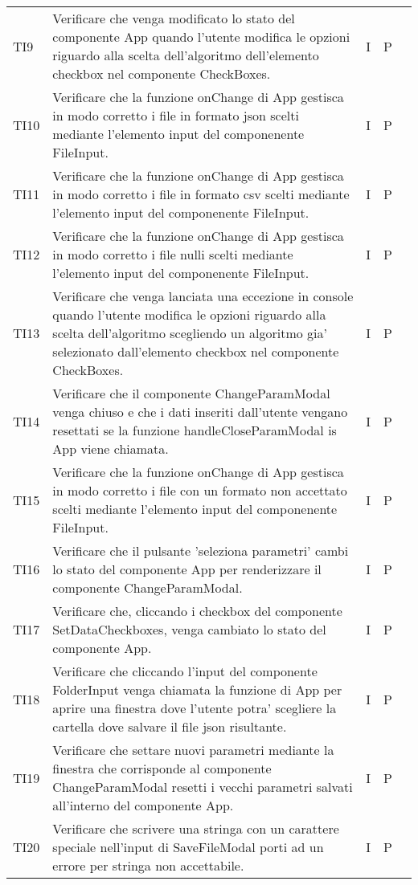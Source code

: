 \begin{longtable} {
		>{}p{15mm} 
		>{}p{79.5mm}
		>{}p{15mm} 
		>{}p{15mm}
		>{}p{0mm}}
    TI9      &  Verificare che venga modificato lo stato del componente App quando l'utente modifica le opzioni riguardo alla scelta dell'algoritmo dell'elemento checkbox nel componente CheckBoxes.& I & P  &\TBstrut \\ [2mm]
    TI10     &  Verificare che la funzione onChange di App gestisca in modo corretto i file in formato json scelti mediante l'elemento input del componenente FileInput.& I & P  &\TBstrut \\ [2mm]
    TI11     &  Verificare che la funzione onChange di App gestisca in modo corretto i file in formato csv scelti mediante l'elemento input del componenente FileInput.& I & P  &\TBstrut \\ [2mm]
    TI12     &  Verificare che la funzione onChange di App gestisca in modo corretto i file nulli scelti mediante l'elemento input del componenente FileInput.& I & P  &\TBstrut \\ [2mm]
    TI13     &  Verificare che venga lanciata una eccezione in console quando l'utente modifica le opzioni riguardo alla scelta dell'algoritmo scegliendo un algoritmo gia' selezionato dall'elemento checkbox nel componente CheckBoxes.& I & P  &\TBstrut \\ [2mm]
    TI14     &  Verificare che il componente ChangeParamModal venga chiuso e che i dati inseriti dall'utente vengano resettati  se la funzione handleCloseParamModal is App viene chiamata.& I & P  &\TBstrut \\ [2mm]
    TI15     &  Verificare che la funzione onChange di App gestisca in modo corretto i file con un formato non accettato scelti mediante l'elemento input del componenente FileInput.& I & P  &\TBstrut \\ [2mm]
    TI16     &  Verificare che il pulsante 'seleziona parametri' cambi lo stato del componente App per renderizzare il componente ChangeParamModal.& I & P  &\TBstrut \\ [2mm]
    TI17     &  Verificare che, cliccando i checkbox del componente SetDataCheckboxes, venga cambiato lo stato del componente App.& I & P  &\TBstrut \\ [2mm]
    TI18     &  Verificare che cliccando l'input del componente FolderInput venga chiamata la funzione di App per aprire una finestra dove l'utente potra' scegliere la cartella dove salvare il file json risultante.& I & P  &\TBstrut \\ [2mm]
    TI19     &  Verificare che settare nuovi parametri mediante la finestra che corrisponde al componente ChangeParamModal resetti i vecchi parametri salvati all'interno del componente App.& I & P  &\TBstrut \\ [2mm]
    TI20     &  Verificare che scrivere una stringa con un carattere speciale nell'input di SaveFileModal porti ad un errore per stringa non accettabile.& I & P  &\TBstrut \\ [2mm]


\end{longtable}
